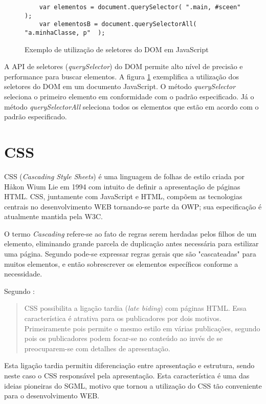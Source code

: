 \begin{figure}
\centering
\begin{verbatim}
    var elementos = document.querySelector( ".main, #sceen"  );
    var elementosB = document.querySelectorAll( "a.minhaClasse, p"  );
\end{verbatim}
\caption{Exemplo de utilização de seletores do DOM em JavaScript}
\label{fig:selectorsSample}
\end{figure}

A API de seletores (\textit{querySelector}) do DOM permite alto
nível de precisão e performance para buscar elementos. A figura
\ref{fig:selectorsSample} exemplifica a utilização dos seletores
do DOM em um documento JavaScript. O método \textit{querySelector}
seleciona o primeiro elemento em conformidade com o padrão
especificado. Já o método \textit{querySelectorAll} seleciona todos os
elementos que estão em acordo com o padrão especificado.

\section{CSS}
CSS (\textit{Cascading Style Sheets}) é uma linguagem de folhas de
estilo criada por Håkon Wium Lie em 1994 com intuito de definir a
apresentação de páginas HTML. CSS, juntamente com JavaScript e HTML,
compõem as tecnologias centrais no desenvolvimento WEB tornando-se
parte da OWP; sua especificação é atualmente mantida pela W3C.

O termo \textit{Cascading} refere-se ao fato de regras serem
herdadas pelos filhos de um elemento, eliminando grande parcela de
duplicação antes necessária para estilizar uma página. Segundo
\cite{html5mostwanted} pode-se expressar regras gerais que são
"cascateadas" para muitos elementos, e então sobrescrever os elementos
específicos conforme a necessidade.

Segundo \cite[pp. 23--24]{CascadingStyleSheets}:
\begin{quote}
CSS possibilita a ligação tardia (\textit{late biding}) com
páginas HTML. Essa característica é atrativa para os publicadores
por dois motivos. Primeiramente pois permite o mesmo estilo em várias
publicações, segundo pois os publicadores podem focar-se no conteúdo
ao invés de se preocuparem-se com detalhes de apresentação.
\end{quote}

Esta ligação tardia permitiu diferenciação entre apresentação e
estrutura, sendo neste caso o CSS responsável pela apresentação. Esta
característica é uma das ideias pioneiras do SGML, motivo que tornou a
utilização do CSS tão conveniente para o desenvolvimento WEB.

